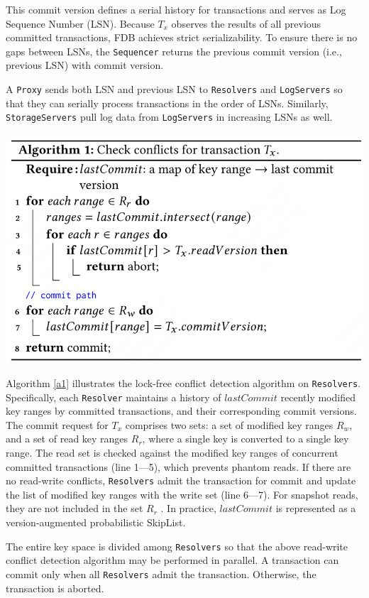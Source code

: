 \documentclass[11pt]{article}
\begin{document}
This commit version defines a serial history for transactions and serves as Log Sequence Number (LSN).
Because \(T_x\) observes the results of all previous committed transactions, FDB achieves strict
serializability. To ensure there is no gaps between LSNs, the \texttt{Sequencer} returns the previous commit version (i.e., previous LSN) with commit version.

A \texttt{Proxy} sends both LSN and previous LSN to \texttt{Resolvers} and \texttt{LogServers} so that they can serially process
transactions in the order of LSNs. Similarly, \texttt{StorageServers} pull log data from \texttt{LogServers} in
increasing LSNs as well.

\begin{center}
\includegraphics[width=.8\textwidth]{../../images/papers/109.png}
\label{a1}
\end{center}

Algorithm \ref{a1} illustrates the lock-free conflict detection algorithm on \texttt{Resolvers}. Specifically,
each \texttt{Resolver} maintains a history of \(lastCommit\) recently modified key ranges by committed
transactions, and their corresponding commit versions. The commit request for \(T_x\) comprises two
sets: a set of modified key ranges \(R_w\), and a set of read key ranges \(R_r\), where a single key
is converted to a single key range. The read set is checked against the modified key ranges of
concurrent committed transactions (line 1—5), which prevents phantom reads. If there are no read-write
conflicts, \texttt{Resolvers} admit the transaction for commit and update the list of modified key ranges with
the write set (line 6—7). For snapshot reads, they are not included in the set \(R_r\) . In practice,
\(lastCommit\) is represented as a version-augmented probabilistic SkipList.

The entire key space is divided among \texttt{Resolvers} so that the above read-write conflict detection
algorithm may be performed in parallel. A transaction can commit only when all \texttt{Resolvers} admit the
transaction. Otherwise, the transaction is aborted.
\end{document}
